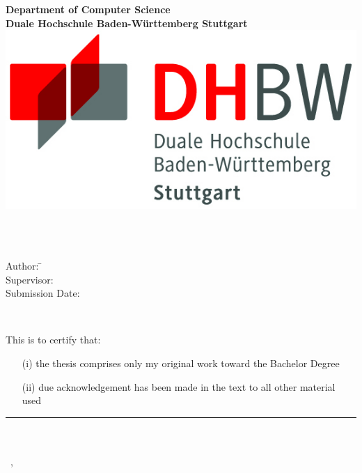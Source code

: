 \newcommand{\titlePage}{

\thispagestyle{empty}
\begin{center}
	\textbf{Department of Computer Science}\\[1mm]
	\textbf{Duale Hochschule Baden-W\"urttemberg Stuttgart}\\[1mm]
	\includegraphics[scale=0.53]{pictures/Logo_DHBW_Stuttgart_4c.jpg}
	
	\vspace{2cm}
	\doublespacing
	{\Huge \textbf{\titleOfThesisOne}}\\
	\singlespacing
	\vspace{2cm}
	{\large \textbf{\typeOfThesis}}\\
	
	\vfill
	\parbox{1cm}{
  		\begin{large}
    			\begin{tabbing}
       			Author: \hspace{2cm}  
        			\=\authorOfThesis\\[2mm]
      			Supervisor: 
        			\>\supervisorOne\\[2mm]
      			Submission Date: 
        			\>\submissionDate\\
    			\end{tabbing}
  		\end{large}
	}\\
\end{center}
\clearpage
}
\titlePage
\thispagestyle{empty}
This is to certify that:
\begin{itemize}
\item[(i)] the thesis comprises only my original work toward the Bachelor Degree
\item[(ii)] due acknowledgement has been made in the text to all other material used
\end{itemize}

\vspace{2cm}
\begin{flushright}
\rule[0mm]{6cm}{0.2mm}\\
\authorOfThesis\\
\submissionDay~\submissionMonth,~\submissionYear\\
\end{flushright}
\clearpage
